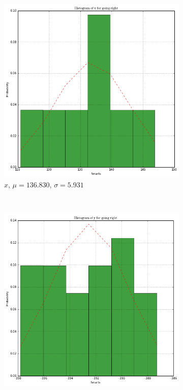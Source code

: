 \documentclass[paper=a4, fontsize=11pt]{scrartcl} %
\begin{document}
\begin{figure}[h!]
    \centering
    \begin{subfigure}[b]{0.3\textwidth}
        \setlength{\fboxsep}{0.5pt} %
        \setlength{\fboxrule}{0.5pt}
        \includegraphics[width=\textwidth,fbox]{images/histogram_5_x_right.png}
        \caption{$x$, $\mu = 136.830$, $\sigma = 5.931$}
    \end{subfigure}
    ~
    \begin{subfigure}[b]{0.3\textwidth}
        \setlength{\fboxsep}{0.5pt} %
        \setlength{\fboxrule}{0.5pt}
        \includegraphics[width=\textwidth,fbox]{images/histogram_5_y_right.png}

\end{subfigure}
\end{figure}
\end{document}
